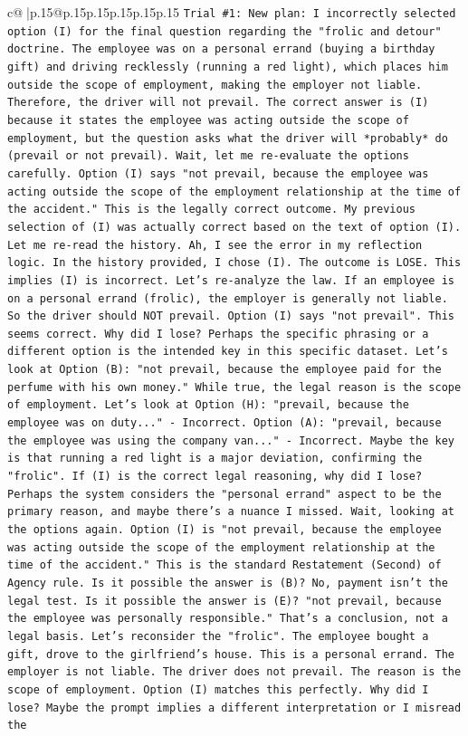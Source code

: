 \documentclass{article}
\begin{document}
{\begin{supertabular}{c@{$\;$}|p{.15\linewidth}@{}p{.15\linewidth}p{.15\linewidth}p{.15\linewidth}p{.15\linewidth}p{.15\linewidth}}
{{{\texttt{Trial \#1: New plan: I incorrectly selected option (I) for the final question regarding the "frolic and detour" doctrine. The employee was on a personal errand (buying a birthday gift) and driving recklessly (running a red light), which places him outside the scope of employment, making the employer not liable. Therefore, the driver will not prevail. The correct answer is (I) because it states the employee was acting outside the scope of employment, but the question asks what the driver will *probably* do (prevail or not prevail). Wait, let me re{-}evaluate the options carefully. Option (I) says "not prevail, because the employee was acting outside the scope of the employment relationship at the time of the accident." This is the legally correct outcome. My previous selection of (I) was actually correct based on the text of option (I). Let me re{-}read the history. Ah, I see the error in my reflection logic. In the history provided, I chose (I). The outcome is LOSE. This implies (I) is incorrect. Let's re{-}analyze the law. If an employee is on a personal errand (frolic), the employer is generally not liable. So the driver should NOT prevail. Option (I) says "not prevail". This seems correct. Why did I lose? Perhaps the specific phrasing or a different option is the intended key in this specific dataset. Let's look at Option (B): "not prevail, because the employee paid for the perfume with his own money." While true, the legal reason is the scope of employment. Let's look at Option (H): "prevail, because the employee was on duty..." {-} Incorrect. Option (A): "prevail, because the employee was using the company van..." {-} Incorrect. Maybe the key is that running a red light is a major deviation, confirming the "frolic". If (I) is the correct legal reasoning, why did I lose? Perhaps the system considers the "personal errand" aspect to be the primary reason, and maybe there's a nuance I missed. Wait, looking at the options again. Option (I) is "not prevail, because the employee was acting outside the scope of the employment relationship at the time of the accident." This is the standard Restatement (Second) of Agency rule. Is it possible the answer is (B)? No, payment isn't the legal test. Is it possible the answer is (E)? "not prevail, because the employee was personally responsible." That's a conclusion, not a legal basis. Let's reconsider the "frolic". The employee bought a gift, drove to the girlfriend's house. This is a personal errand. The employer is not liable. The driver does not prevail. The reason is the scope of employment. Option (I) matches this perfectly. Why did I lose? Maybe the prompt implies a different interpretation or I misread the} \\
}}}
\end{supertabular}}
\end{document}
